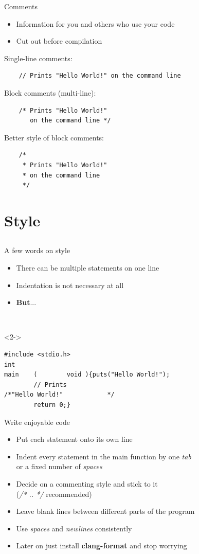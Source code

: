 \documentclass[10pt,graphics,aspectratio=169,table]{beamer}
\begin{document}
\begin{frame}[fragile]{Comments}
	\begin{itemize}
		\item Information for you and others who use your code
		\item Cut out before compilation
	\end{itemize}
	Single-line comments:
	\begin{lstlisting}
	// Prints "Hello World!" on the command line
\end{lstlisting}
	Block comments (multi-line):
	\begin{lstlisting}
	/* Prints "Hello World!"
	   on the command line */
\end{lstlisting}
	Better style of block comments:
	\begin{lstlisting}
	/*
	 * Prints "Hello World!"
	 * on the command line
	 */
\end{lstlisting}
\end{frame}
\section{Style}
\subsection{}
\begin{frame}[fragile]{A few words on style}
	\begin{itemize}
		\item There can be multiple statements on one line
		\item Indentation is not necessary at all
		\item<2-> \textbf{But}...
	\end{itemize}
	\ \\
	\begin{uncoverenv}<2->
	\begin{lstlisting}
#include <stdio.h>
int
main	(        void ){puts("Hello World!");
		// Prints
/*"Hello World!"			*/
		return 0;}
\end{lstlisting}
	\end{uncoverenv}
\end{frame}
\begin{frame}[fragile]{Write enjoyable code}
	\begin{itemize}
		\item Put each statement onto its own line
		\item Indent every statement in the main function by one \textit{tab}\\
		 or a fixed number of \textit{spaces}
		\item Decide on a commenting style and stick to it\\
		(\textit{/* .. */} recommended)
		\item Leave blank lines between different parts of the program
		\item Use \textit{spaces} and \textit{newlines} consistently
		\item Later on just install \textbf{clang-format} and stop worrying
	\end{itemize}
\end{frame}
\end{document}
